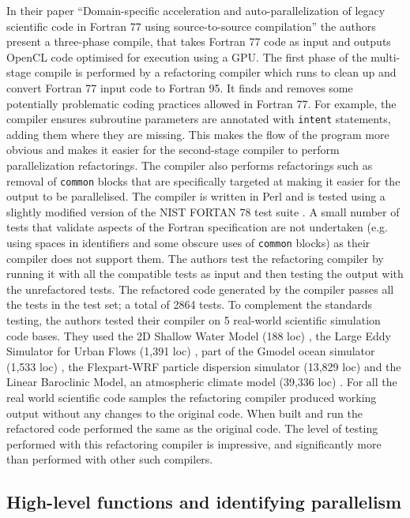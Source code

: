 \documentclass{mpaper}
\begin{document}
In their paper ``Domain-specific acceleration and auto-parallelization of legacy scientific code in Fortran 77 using source-to-source compilation''\cite{VanderbauwhedeDavidson2018} the authors present a three-phase compile, that takes Fortran 77 code as input and outputs OpenCL code optimised for execution using a GPU. The first phase of the multi-stage compile is performed by a refactoring compiler which runs to clean up and convert Fortran 77 input code to Fortran 95. It finds and removes some potentially problematic coding practices allowed in Fortran 77. For example, the compiler ensures subroutine parameters are annotated with \texttt{intent} statements, adding them where they are missing. This makes the flow of the program more obvious and makes it easier for the second-stage compiler to perform parallelization refactorings. The compiler also performs refactorings such as removal of \texttt{common} blocks that are specifically targeted at making it easier for the output to be parallelised. The compiler is written in Perl and is tested using a slightly modified version \cite{Fortran2000} of the  NIST FORTAN 78 test suite \cite{NISTITL}. A small number of tests that validate aspects of the Fortran specification are not undertaken (e.g. using spaces in identifiers and some obscure uses of \texttt{common} blocks) as their compiler does not support them. The authors test the refactoring compiler by running it with all the compatible tests as input and then testing the output with the unrefactored tests. The refactored code generated by the compiler passes all the tests in the test set; a total of 2864 tests. To complement the standards testing, the authors tested their compiler on 5 real-world scientific simulation code bases. They used the 2D Shallow Water Model (188 loc) \cite{Hall2009}, the Large Eddy Simulator for Urban Flows (1,391 loc) \cite{Nakayama2011}, part of the Gmodel ocean simulator (1,533 loc) \cite{Burgers2002}, the Flexpart-WRF particle dispersion simulator  (13,829 loc) \cite{Brioude2013} and the Linear Baroclinic Model, an atmospheric climate model (39,336 loc) \cite{Watanabe2003}. For all the real world scientific code samples the refactoring compiler produced working output without any changes to the original code. When built and run the refactored code performed the same as the original code. The level of testing performed with this refactoring compiler is impressive, and significantly more than performed with other such compilers.

\subsection{High-level functions and identifying parallelism}
\end{document}
